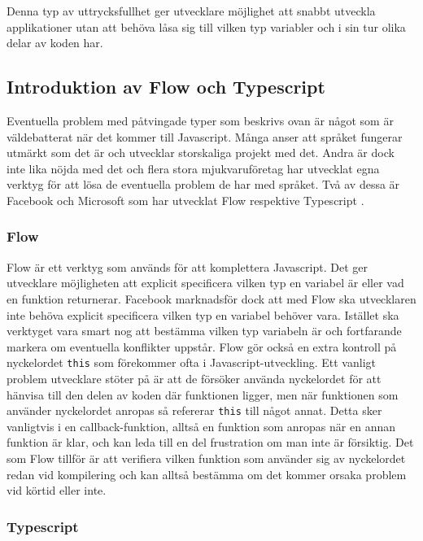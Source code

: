 Denna typ av uttrycksfullhet ger utvecklare möjlighet att snabbt utveckla applikationer utan att behöva låsa sig till vilken typ variabler och i sin tur olika delar av koden har.


\subsection{Introduktion av Flow och Typescript}

Eventuella problem med påtvingade typer som beskrivs ovan är något som är väldebatterat när det kommer till Javascript. Många anser att språket fungerar utmärkt som det är och utvecklar storskaliga projekt med det. Andra är dock inte lika nöjda med det \cite{js-bad} och flera stora mjukvaruföretag har utvecklat egna verktyg för att lösa de eventuella problem de har med språket. Två av dessa är Facebook och Microsoft som har utvecklat Flow \cite{info-flow} respektive Typescript \cite{typescript}.

\subsubsection{Flow}

Flow är ett verktyg som används för att komplettera Javascript. Det ger utvecklare möjligheten att explicit specificera vilken typ en variabel är eller vad en funktion returnerar. Facebook marknadsför dock att med Flow ska utvecklaren inte behöva explicit specificera vilken typ en variabel behöver vara. Istället ska verktyget vara smart nog att bestämma vilken typ variabeln är och fortfarande markera om eventuella konflikter uppstår. Flow gör också en extra kontroll på nyckelordet \texttt{this} som förekommer ofta i Javascript-utveckling. Ett vanligt problem utvecklare stöter på är att de försöker använda nyckelordet för att hänvisa till den delen av koden där funktionen ligger, men när funktionen som använder nyckelordet anropas så refererar \texttt{this} till något annat. Detta sker vanligtvis i en callback-funktion, alltså en funktion som anropas när en annan funktion är klar, och kan leda till en del frustration om man inte är försiktig. Det som Flow tillför är att verifiera vilken funktion som använder sig av nyckelordet redan vid kompilering och kan alltså bestämma om det kommer orsaka problem vid körtid eller inte. 

\subsubsection{Typescript}

